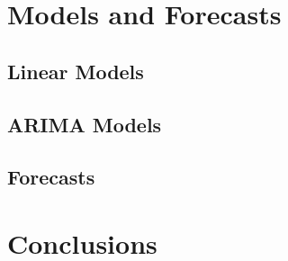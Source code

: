 \documentclass[AER]{AEA}
\begin{document}
\section{Models and Forecasts}\label{models-and-forecasts}

\subsection{Linear Models}\label{linear-models}

\subsection{ARIMA Models}\label{arima-models}

\subsection{Forecasts}\label{forecasts}

\section{Conclusions}\label{conclusions}
\end{document}
